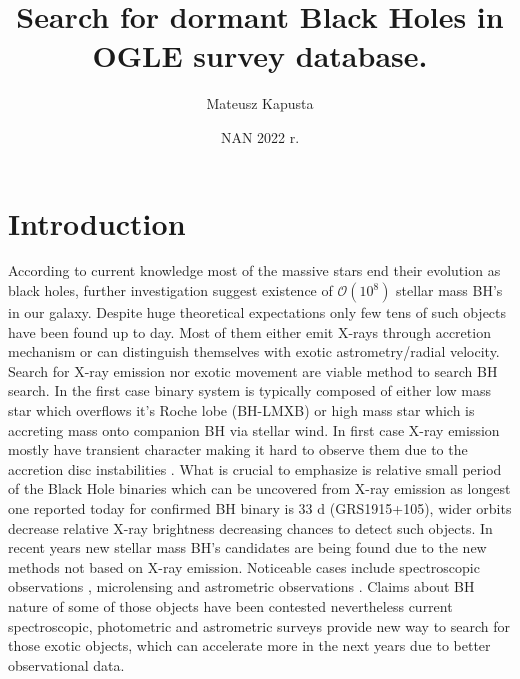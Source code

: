 \documentclass{pracalicmgr}
\author{Mateusz Kapusta}
\title{Search for dormant Black Holes in OGLE survey database.}
\date{NAN 2022 r.}
\begin{document}
    \maketitle
    \let\cleardoublepage\clearpage
\begin{abstract}
    \lipsum[2,7]
\end{abstract}

\tableofcontents

\chapter{Introduction}
\hspace{1cm} According to current knowledge most of the massive stars end their evolution as black holes, further investigation suggest existence of $\mathcal{O}(10^8)$ 
stellar mass BH's \citep{brown_scenario_1994} in our galaxy. Despite huge theoretical expectations only few tens of such objects have been found up to day. Most of them either emit X-rays through
accretion mechanism or can distinguish themselves with exotic astrometry/radial velocity. Search for X-ray emission nor exotic movement are viable method to search BH search.
In the first case binary system is typically composed of either low mass star which overflows it's Roche lobe
(BH-LMXB) or high mass star which is accreting mass onto companion BH via stellar wind. In first case X-ray emission mostly have transient character \citep{bambi_transient_2016}
making it hard to observe them due to the accretion disc instabilities \citep{lasota_disc_2001}. What is crucial to emphasize is relative small period of the Black Hole binaries 
which can be uncovered from X-ray emission as longest one reported today for confirmed BH binary is $33$ d (GRS1915+105), wider orbits decrease relative X-ray brightness decreasing
chances to detect such objects.
In recent years new stellar mass BH's candidates are being found due to the new methods not based on X-ray emission. Noticeable cases include spectroscopic observations 
\citep{liu_wide_2019,jayasinghe_unicorn_2021}, microlensing \citep{sahu_isolated_2022} and astrometric observations \citep{el-badry_sun-like_2022}. Claims about BH nature of 
some of those objects have been contested nevertheless current spectroscopic, photometric and astrometric surveys provide new way to search for those exotic objects, which can
accelerate more in the next years due to better observational data.
\end{document}
